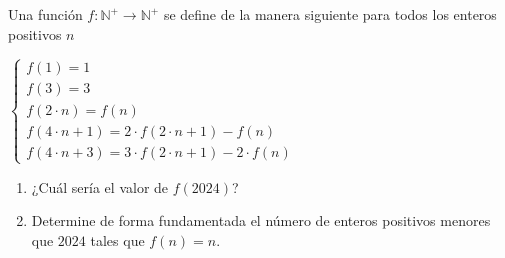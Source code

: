 \begin{problem}
Una función $f: \mathbb{N}^{+} \to \mathbb{N}^{+}$ se define de la manera siguiente para todos los enteros positivos $n$

	\begin{center}
		$\begin{cases}
			f(1) = 1 \\
			f(3) = 3 \\
			f(2 \cdot n) = f(n)\\
			f(4 \cdot n + 1) = 2 \cdot f(2 \cdot n + 1) - f(n) \\
			f(4 \cdot n + 3) = 3 \cdot f(2 \cdot n + 1) - 2 \cdot f(n)
		\end{cases}$
	\end{center}
	
	\begin{enumerate}[label={\alph*)}]
		\item{¿Cuál sería el valor de $f(2024)$?}
		\item{Determine de forma fundamentada el número de enteros positivos menores que $2024$ tales que $f(n) = n$.}
	\end{enumerate}
\end{problem}
